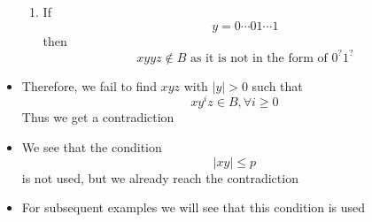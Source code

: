 \begin{frame}[allowframebreaks]
\begin{itemize}
\begin{enumerate}
\item If
  \begin{equation*}
y = 0 \cdots 0 1 \cdots 1
\end{equation*}
then
\begin{equation*}
xyyz \notin B \text{ as it is not in the form of } 0^? 1^?
\end{equation*}
\end{enumerate}
\item Therefore, we fail to find $xyz$ with $|y|> 0$ such that
  \begin{equation*}
     xy^i z \in B, \forall i \geq 0
  \end{equation*}
Thus we get a contradiction
\item We see that the condition
  \begin{equation*}
    |xy| \leq p
  \end{equation*}
is not used, but we already reach the contradiction
\item For subsequent examples we will see that this condition is used
\end{itemize}\end{frame}

